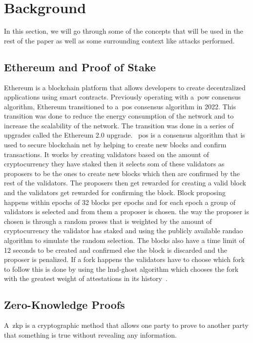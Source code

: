 
\section{Background}\label{sec:background}
In this section, we will go through some of the concepts that will be used in the rest of the paper as well as some surrounding context like attacks performed.

\subsection{Ethereum and Proof of Stake}\label{subsec:ethereum-and-proof-of-stake}
Ethereum is a blockchain platform that allows developers to create decentralized applications using smart contracts.
Previously operating with a~\gls{pow} consensus algorithm, Ethereum transitioned to a~\gls{pos} consensus algorithm in 2022.
This transition was done to reduce the energy consumption of the network and to increase the scalability of the network.
The transition was done in a series of upgrades called the Ethereum 2.0 upgrade.
~\gls{pos} is a consensus algorithm that is used to secure blockchain net by helping to create new blocks and confirm transactions.
It works by creating validators based on the amount of cryptocurrency they have staked then it selects som of these validators as proposers to be the ones to create new blocks which then are confirmed by the rest of the validators.
The proposers then get rewarded for creating a valid block and the validators get rewarded for confirming the block.
Block proposing happens within epochs of 32 blocks per epochs and for each epoch a group of validators is selected and from them a proposer is chosen.
the way the proposer is chosen is through a random proses that is weighted by the amount of cryptocurrency the validator has staked and using the publicly available \gls{randao} algorithm to simulate the random selection.
The blocks also have a time limit of 12 seconds to be created and confirmed else the block is discarded and the proposer is penalized.
If a fork happens the validators have to choose which fork to follow this is done by using the \gls{lmd-ghost} algorithm which chooses the fork with the greatest weight of attestations in its history~\cite{EthereumProof-of-stakePoS}.


\subsection{Zero-Knowledge Proofs}\label{subsec:zero-knowledge-proofs}
A~\gls{zkp} is a cryptographic method that allows one party to prove to another party that something is true without revealing any information.

